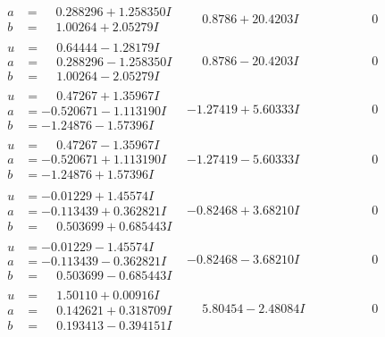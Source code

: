\documentclass[1p]{elsarticle_modified}
\theoremstyle{definition}
\begin{document}
$$\begin{array}{c|c|c}
\begin{aligned}
a &= \phantom{-}0.288296 + 1.258350 I \\
b &= \phantom{-}1.00264 + 2.05279 I\end{aligned}
 & \phantom{-}0.8786 + 20.4203 I & \phantom{-0.000000 } 0 \\ \hline\begin{aligned}
u &= \phantom{-}0.64444 - 1.28179 I \\
a &= \phantom{-}0.288296 - 1.258350 I \\
b &= \phantom{-}1.00264 - 2.05279 I\end{aligned}
 & \phantom{-}0.8786 - 20.4203 I & \phantom{-0.000000 } 0 \\ \hline\begin{aligned}
u &= \phantom{-}0.47267 + 1.35967 I \\
a &= -0.520671 - 1.113190 I \\
b &= -1.24876 - 1.57396 I\end{aligned}
 & -1.27419 + 5.60333 I & \phantom{-0.000000 } 0 \\ \hline\begin{aligned}
u &= \phantom{-}0.47267 - 1.35967 I \\
a &= -0.520671 + 1.113190 I \\
b &= -1.24876 + 1.57396 I\end{aligned}
 & -1.27419 - 5.60333 I & \phantom{-0.000000 } 0 \\ \hline\begin{aligned}
u &= -0.01229 + 1.45574 I \\
a &= -0.113439 + 0.362821 I \\
b &= \phantom{-}0.503699 + 0.685443 I\end{aligned}
 & -0.82468 + 3.68210 I & \phantom{-0.000000 } 0 \\ \hline\begin{aligned}
u &= -0.01229 - 1.45574 I \\
a &= -0.113439 - 0.362821 I \\
b &= \phantom{-}0.503699 - 0.685443 I\end{aligned}
 & -0.82468 - 3.68210 I & \phantom{-0.000000 } 0 \\ \hline\begin{aligned}
u &= \phantom{-}1.50110 + 0.00916 I \\
a &= \phantom{-}0.142621 + 0.318709 I \\
b &= \phantom{-}0.193413 - 0.394151 I\end{aligned}
 & \phantom{-}5.80454 - 2.48084 I & \phantom{-0.000000 } 0 \\ \hline\begin{aligned}

\end{aligned}
\end{array}$$
\end{document}
